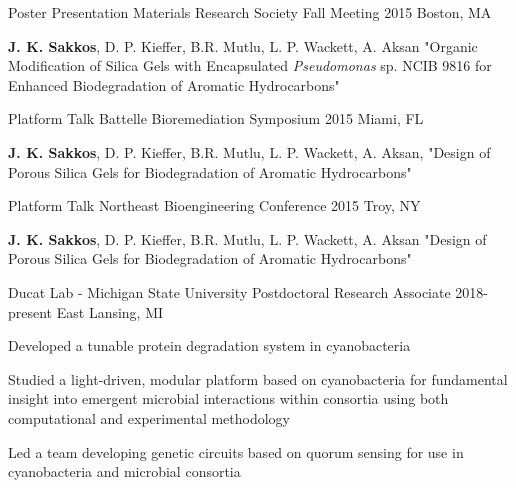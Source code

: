 \documentclass[11pt, letterpaper]{awesome-cv} %
\begin{document}
\begin{sloppypar}
\begin{cventries}
	\cventry
	{Poster Presentation}
	{Materials Research Society Fall Meeting}
	{2015} %
	{Boston, MA} %
	{ %
		\begin{cvitems}
			\item {\textbf{J. K. Sakkos}, D. P. Kieffer, B.R. Mutlu, L. P. Wackett, A. Aksan "Organic Modification of Silica Gels with Encapsulated \textit{Pseudomonas} sp. NCIB 9816 for Enhanced Biodegradation of Aromatic Hydrocarbons"}
		\end{cvitems}
	}

	\cventry
	{Platform Talk}
	{Battelle Bioremediation Symposium}
	{2015} %
	{Miami, FL} %
	{ %
		\begin{cvitems}
			\item {\textbf{J. K. Sakkos}, D. P. Kieffer, B.R. Mutlu, L. P. Wackett, A. Aksan, "Design of Porous Silica Gels for Biodegradation of Aromatic Hydrocarbons"}
		\end{cvitems}
	}

	\cventry
	{Platform Talk}
	{Northeast Bioengineering Conference}
	{2015} %
	{Troy, NY} %
	{ %
		\begin{cvitems}
			\item {\textbf{J. K. Sakkos}, D. P. Kieffer, B.R. Mutlu, L. P. Wackett, A. Aksan "Design of Porous Silica Gels for Biodegradation of Aromatic Hydrocarbons"}
		\end{cvitems}
	}
	
\end{cventries}
%

\begin{cventries}
	
	\cventry
	{Ducat Lab - Michigan State University} %
	{Postdoctoral Research Associate} %
	{2018-present} %
	{East Lansing, MI} %
	{ %
		\begin{cvitems}
			\item {Developed a tunable protein degradation system in cyanobacteria}
			\item {Studied a light-driven, modular platform based on cyanobacteria for fundamental insight into emergent microbial interactions within consortia using both computational and experimental methodology}
			\item {Led a team developing genetic circuits based on quorum sensing for use in cyanobacteria and microbial consortia}
		\end{cvitems}
	}


\end{cventries}
\end{sloppypar}
\end{document}
